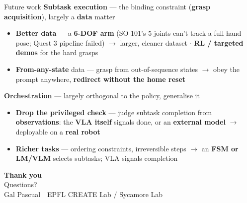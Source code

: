 \documentclass[aspectratio=169,10pt]{beamer}
\newcommand{\hl}[1]{\textcolor{epflred}{\textbf{#1}}}
\begin{document}
\begin{frame}{Future work}
  \textbf{Subtask execution} \; --- \; the binding constraint (\hl{grasp acquisition}), largely a \hl{data} matter
  \begin{itemize}
    \item \hl{Better data} --- a \hl{6-DOF arm} (SO-101's 5 joints can't track a full hand pose; Quest 3 pipeline failed) $\rightarrow$ larger, cleaner dataset \; $\cdot$ \; \hl{RL / targeted demos} for the hard grasps
    \item \hl{From-any-state} data --- grasp from out-of-sequence states $\rightarrow$ obey the prompt anywhere, \hl{redirect without the home reset}
  \end{itemize}
  \vfill
  \textbf{Orchestration} \; --- \; largely orthogonal to the policy, generalise it
  \begin{itemize}
    \item \hl{Drop the privileged check} --- judge subtask completion from \hl{observations}: the \hl{VLA itself} signals done, or an \hl{external model} $\rightarrow$ deployable on a \hl{real robot}
    \item \hl{Richer tasks} --- ordering constraints, irreversible steps $\rightarrow$ an \hl{FSM or LM/VLM} selects subtasks; VLA signals completion
  \end{itemize}
\end{frame}

{
\begin{frame}[plain]
  \centering
  \vspace{1.2cm}
  {\color{epflred}\Huge\textbf{Thank you}}\\[0.8em]
  {\large Questions?}\\[1.4em]
  {\footnotesize Gal Pascual \,\textbullet\, EPFL CREATE Lab / Sycamore Lab}
\end{frame}}
\end{document}
